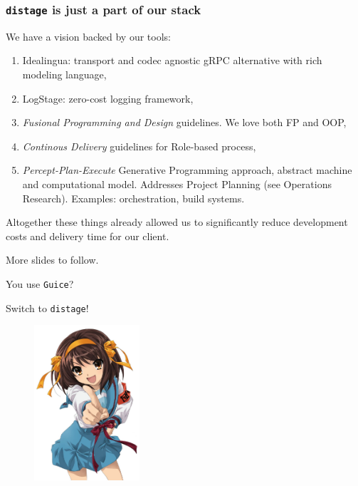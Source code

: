 \documentclass[usenames,dvipsnames]{beamer}
\newcommand{\distage}{\texttt{distage}\xspace}
\begin{document}
\begin{frame}
\frametitle{\distage is just a part of our stack}
We have a vision backed by our tools:
\begin{enumerate}
\item Idealingua: transport and codec agnostic gRPC alternative with rich modeling language,
\item LogStage: zero-cost logging framework,
\item \textit{Fusional Programming and Design} guidelines. We love both FP and OOP,
\item \textit{Continous Delivery} guidelines for Role-based process, 
\item \textit{Percept-Plan-Execute} Generative Programming approach, abstract machine and computational model.
Addresses Project Planning (see Operations Research). Examples: orchestration, build systems.

\end{enumerate}

Altogether these things already allowed us to significantly reduce development costs and
delivery time for our client.\newline

More slides to follow.
\end{frame}

\begin{frame}
\begin{center}
\Huge
You use \texttt{Guice}?

Switch to \distage!

\begin{figure}
    \includegraphics[width=0.35\textwidth]{media/haruhi.jpg}
\end{figure}

\end{center}
\end{frame}
\end{document}
